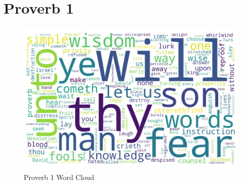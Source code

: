 \chapter{Proverb 1}

\begin{figure}
  \includegraphics[width=\linewidth]{20OT-Proverbs/Proverb1-WordCloud.jpg}
  \caption{Proverb 1 Word Cloud}
  \label{fig:Proverb 1 word Cloud}
\end{figure}

